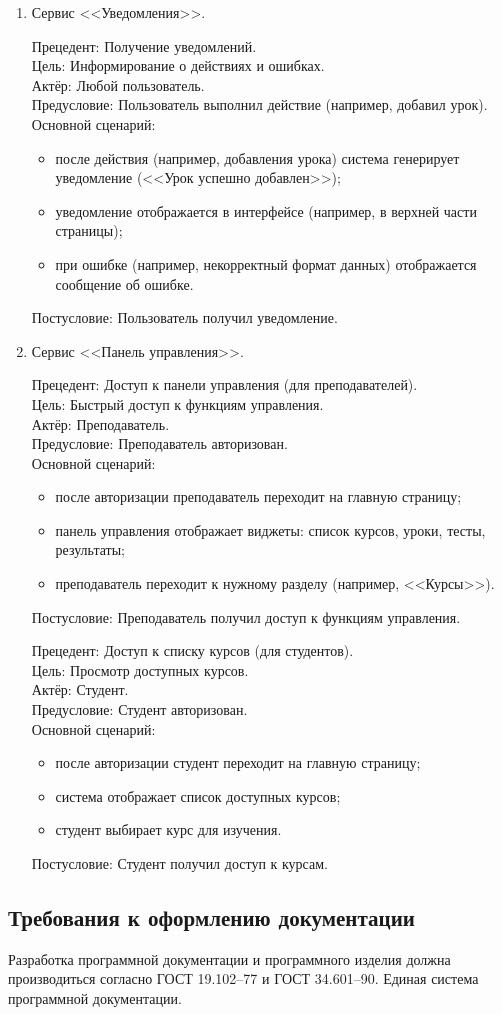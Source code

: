 \begin{enumerate}
	\item {Сервис <<Уведомления>>}.
	
	{Прецедент: Получение уведомлений}. \\
	{Цель}: Информирование о действиях и ошибках. \\
	{Актёр}: Любой пользователь. \\
	{Предусловие}: Пользователь выполнил действие (например, добавил урок). \\
	{Основной сценарий}:
	\begin{itemize}
		\item после действия (например, добавления урока) система генерирует уведомление (<<Урок успешно добавлен>>);
		\item уведомление отображается в интерфейсе (например, в верхней части страницы);
		\item при ошибке (например, некорректный формат данных) отображается сообщение об ошибке.
	\end{itemize}
	{Постусловие}: Пользователь получил уведомление.
	
	\item {Сервис <<Панель управления>>}.
	
	{Прецедент: Доступ к панели управления (для преподавателей)}. \\
	{Цель}: Быстрый доступ к функциям управления. \\
	{Актёр}: Преподаватель. \\
	{Предусловие}: Преподаватель авторизован. \\
	{Основной сценарий}:
	\begin{itemize}
		\item после авторизации преподаватель переходит на главную страницу;
		\item панель управления отображает виджеты: список курсов, уроки, тесты, результаты;
		\item преподаватель переходит к нужному разделу (например, <<Курсы>>).
	\end{itemize}
	{Постусловие}: Преподаватель получил доступ к функциям управления.
	
	{Прецедент: Доступ к списку курсов (для студентов)}. \\
	{Цель}: Просмотр доступных курсов. \\
	{Актёр}: Студент. \\
	{Предусловие}: Студент авторизован. \\
	{Основной сценарий}:
	\begin{itemize}
		\item после авторизации студент переходит на главную страницу;
		\item система отображает список доступных курсов;
		\item студент выбирает курс для изучения.
	\end{itemize}
	{Постусловие}: Студент получил доступ к курсам.
\end{enumerate}

\subsection{Требования к оформлению документации}

Разработка программной документации и программного изделия должна производиться согласно ГОСТ 19.102–77 и ГОСТ 34.601–90. Единая система программной документации.

